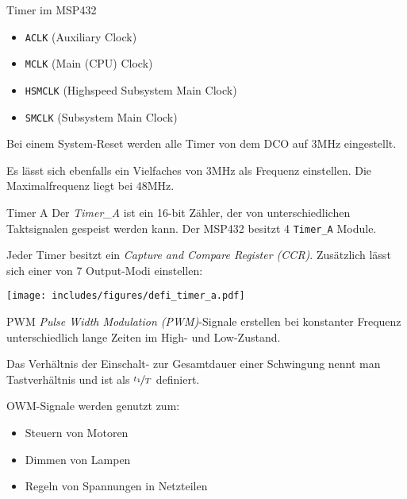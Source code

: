 \begin{bonus}{Timer im MSP432}
    \begin{itemize}
        \item \texttt{ACLK} (Auxiliary Clock)
        \item \texttt{MCLK} (Main (CPU) Clock)
        \item \texttt{HSMCLK} (Highspeed Subsystem Main Clock)
        \item \texttt{SMCLK} (Subsystem Main Clock)
    \end{itemize}

    Bei einem System-Reset werden alle Timer von dem DCO auf 3MHz eingestellt.

    Es lässt sich ebenfalls ein Vielfaches von 3MHz als Frequenz einstellen.
    Die Maximalfrequenz liegt bei 48MHz.
\end{bonus}

\begin{defi}{Timer A}
    Der \emph{Timer\_A} ist ein 16-bit Zähler, der von unterschiedlichen Taktsignalen gespeist werden kann.
    Der MSP432 besitzt 4 \texttt{Timer\_A} Module.

    Jeder Timer besitzt ein \emph{Capture and Compare Register (CCR)}.
    Zusätzlich lässt sich einer von 7 Output-Modi einstellen:

    \begin{center}
        \texttt{[image: includes/figures/defi\_timer\_a.pdf]}
    \end{center}
\end{defi}

\begin{defi}{PWM}
    \emph{Pulse Width Modulation (PWM)}-Signale erstellen bei konstanter Frequenz unterschiedlich lange Zeiten im High- und Low-Zustand.

    Das Verhältnis der Einschalt- zur Gesamtdauer einer Schwingung nennt man Tastverhältnis und ist als $\nicefrac{t_1}{T}$ definiert.

    OWM-Signale werden genutzt zum:
    \begin{itemize}
        \item Steuern von Motoren
        \item Dimmen von Lampen
        \item Regeln von Spannungen in Netzteilen
    \end{itemize}
\end{defi}

